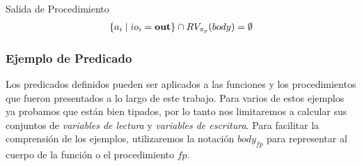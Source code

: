 \begin{Predicado}
\label{PPSalida}
Salida de Procedimiento
\begin{gather*}
\{ a_i \mid io_i = \mathbf{out} \} \cap RV_{\pi_{p}}(body) = \emptyset
\end{gather*}
\end{Predicado}

\iffalse
\subsubsection{Predicados para Tamaños Dinámicos}

Supongamos que nos encontramos analizando una función o un procedimiento con alguna de las formas previas; donde el conjunto de tamaños dinámicos introducidos en el respectivo prototipo se define de la manera habitual.
\begin{gather*}
\pi_{sn} = \DAS{\theta_1} \cup \ldots \cup \DAS{\theta_l}
\end{gather*}

El tamaño de un arreglo es constante, lo cual implica que su valor no cambiará durante la ejecución de un programa.
En el caso particular de un tamaño dinámico, su valor es desconocido hasta que comienza la ejecución, momento donde queda determinado de manera única y definitiva.
Recordar que las variables, los parámetros de funciones y procedimientos, y los tamaños dinámicos, emplean la misma clase de identificadores; por lo cual, en cualquier sitio donde se espera alguno de estos elementos sintácticos, es posible especificar a cualquier otro.
En consecuencia, es necesario evitar la modificación de los tamaños dinámicos de arreglos durante la ejecución de la función o el procedimiento.

\begin{Predicado}
\label{PTDinamico}
Tamaño Dinámico
\begin{gather*}
\pi_{sn} \cap \WVs{body} = \emptyset
\end{gather*}
\end{Predicado}
\fi

\subsubsection{Ejemplo de Predicado}

Los predicados definidos pueden ser aplicados a las funciones y los procedimientos que fueron presentados a lo largo de este trabajo.
Para varios de estos ejemplos ya probamos que están bien tipados, por lo tanto nos limitaremos a calcular sus conjuntos de \textit{variables de lectura} y \textit{variables de escritura}.
Para facilitar la comprensión de los ejemplos, utilizaremos la notación $body_{fp}$ para representar al cuerpo de la función o el procedimiento $fp$.

